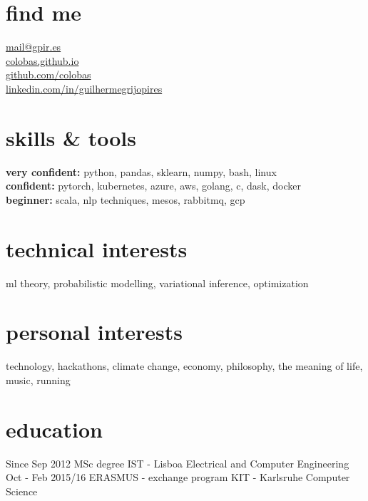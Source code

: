 \documentclass[]{colobas-cv}
\begin{document}

\begin{minipage}[t]{0.3\textwidth}
\section{find me}
  \vspace{7pt}
  \href{mailto:mail@gpir.es}{mail@gpir.es}\\
  \href{https://colobas.github.io}{colobas.github.io}\\
  \href{https://github.com/colobas}{github.com/colobas}\\
  \href{https://linkedin.com/in/guilhermegrijopires/}{linkedin.com/in/guilhermegrijopires}%
\end{minipage}
\hfill
\begin{minipage}[t]{0.3\textwidth}
\section{skills \& tools}
  \vspace{7pt}
  \textbf{very confident:} python, pandas, sklearn, numpy, bash, linux\\
  \textbf{confident:} pytorch, kubernetes, azure, aws, golang, c, dask, docker\\
  \textbf{beginner:} scala, nlp techniques, mesos, rabbitmq, gcp%
\end{minipage}
\hfill
\begin{minipage}[t]{0.3\textwidth}
\section{technical interests}
  \vspace{7pt}
  ml theory, probabilistic modelling, variational inference, optimization%
  \vspace{15pt}
\section{personal interests}
  \vspace{7pt}
  technology, hackathons, climate change, economy, philosophy, the meaning of life,
  music, running
\end{minipage}

\vspace{0.5cm}

\section{education}
\entry
  {Since Sep 2012}
  {MSc degree}
  {IST - Lisboa}
  {Electrical and Computer Engineering}
\entry
  {Oct - Feb 2015/16}
  {ERASMUS - exchange program}
  {KIT - Karlsruhe}
  {Computer Science}
\end{document}
